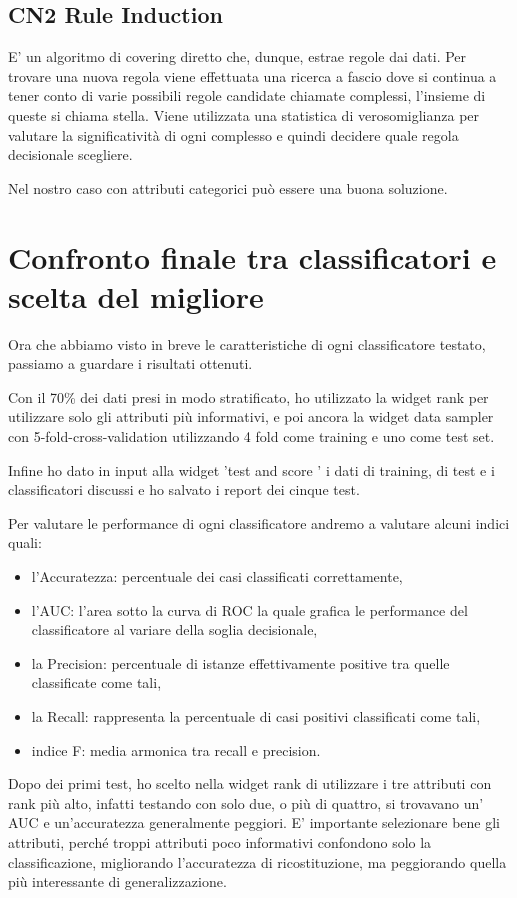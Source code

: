 \documentclass[a4paper, 12p]{report}
\begin{document}
\subsection{CN2 Rule Induction}
E' un algoritmo di covering diretto che, dunque, estrae regole dai dati. Per trovare una nuova regola viene effettuata una ricerca a fascio dove si continua a tener conto di varie possibili regole candidate chiamate complessi, l'insieme di queste si chiama stella.
Viene utilizzata una statistica di verosomiglianza per valutare la significatività di ogni complesso e quindi decidere quale regola decisionale scegliere. 

Nel nostro caso con attributi categorici può essere una buona soluzione.
	
\section{Confronto finale tra classificatori e scelta del migliore}
Ora che abbiamo visto in breve le caratteristiche di ogni classificatore testato, passiamo a guardare i risultati ottenuti. 

Con il 70\% dei dati presi in modo stratificato, ho utilizzato la widget rank per utilizzare solo gli attributi più informativi, e poi ancora la widget data sampler con 5-fold-cross-validation utilizzando 4 fold come training e uno come test set.

Infine ho dato in input alla widget 'test and score ' i dati di training, di test e i classificatori discussi e ho salvato i report dei cinque test. 


Per valutare le performance di ogni classificatore andremo a valutare alcuni indici quali:
\begin{itemize}
\item l'Accuratezza: percentuale dei casi classificati correttamente,
\item l'AUC: l'area sotto la curva di ROC la quale grafica le performance del classificatore al variare della soglia decisionale, 
\item la Precision:  percentuale di istanze effettivamente positive tra quelle classificate come tali,
\item la Recall: rappresenta la percentuale di casi positivi classificati come tali,
\item indice F: media armonica tra recall e precision.
\end{itemize}
Dopo dei primi test, ho scelto nella widget rank di utilizzare i tre attributi con rank più alto, infatti testando con solo due, o più di quattro, si trovavano un' AUC e un'accuratezza generalmente peggiori. E' importante selezionare bene gli attributi, perché troppi attributi poco informativi confondono solo la classificazione, migliorando l'accuratezza di ricostituzione, ma peggiorando quella più interessante di generalizzazione.
\end{document}
